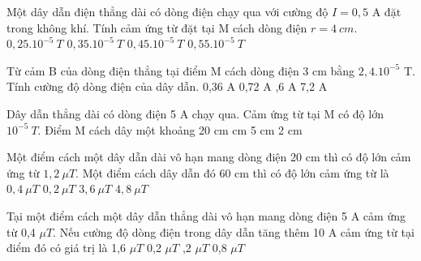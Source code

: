 \begin{vidu} %
Một dây dẫn điện thẳng dài có dòng điện chạy qua với cường độ $I=0,5$ A đặt trong không khí. Tính cảm ứng từ đặt tại M cách dòng điện $r=4\ cm$.
\choice
{\True $0,25.10^{-5}\ T$}
{$0,35.10^{-5}\ T$}
{$0,45.10^{-5}\ T$}
{$0,55.10^{-5}\ T$}	
\end{vidu}
\begin{vidu} %
Từ cảm B của dòng điện thẳng tại điểm M cách dòng điện 3 cm bằng $2,4.10^{-5}$ T. Tính cường độ dòng điện của dây dẫn.
\choice
{0,36 A}
{0,72 A}
{,6 A}
{7,2 A}
\end{vidu}
\begin{vidu} %
Dây dẫn thẳng dài có dòng điện 5 A chạy qua. Cảm ứng từ tại M có độ lớn $10^{-5}\ T$. Điểm M cách dây một khoảng
\choice
{20 cm}
{ cm}
{5 cm}
{2 cm}
\end{vidu}
\begin{vidu} %
Một điểm cách một dây dẫn dài vô hạn mang dòng điện 20 cm thì có độ lớn cảm ứng từ $1,2\ \mu T$. Một điểm cách dây dẫn đó 60 cm thì có độ lớn cảm ứng từ là
\choice
{\True $0,4\ \mu T$}
{$0,2\ \mu T$}
{$3,6\ \mu T$}
{$4,8\ \mu T$}
\end{vidu}
\begin{vidu} %
Tại một điểm cách một dây dẫn thẳng dài vô hạn mang dòng điện 5 A cảm ứng từ 0,4 $\mu T$. Nếu cường độ dòng điện trong dây dẫn tăng thêm 10 A cảm ứng từ tại điểm đó có giá trị là
\choice
{1,6 $\mu T$}
{0,2 $\mu T$}
{,2 $\mu T$}
{0,8 $\mu T$}
\end{vidu}

